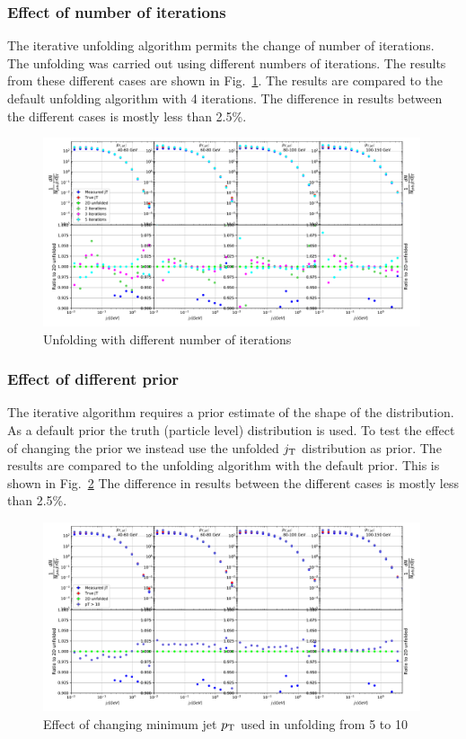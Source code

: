 \subsubsection{Effect of number of iterations}
\label{sec:iterations}
The iterative unfolding algorithm permits the change of number of iterations. The unfolding was carried out using different numbers of iterations. The results from these different cases are shown in Fig.~\ref{fig:iterations}. The results are compared to the default unfolding algorithm with 4 iterations. The difference in results between the different cases is mostly less than 2.5\%.
\begin{figure}
\includegraphics[width=0.99\textwidth]{figures/systematics/IterationsComparison.pdf}
\caption{Unfolding with different number of iterations}
\label{fig:iterations}
\end{figure}

\subsubsection{Effect of different prior}
\label{sec:prior}
The iterative algorithm requires a prior estimate of the shape of the distribution. As a default prior the truth (particle level) distribution is used. To test the effect of changing the prior we instead use the unfolded $j_{\rm T}$ distribution as prior. The results are compared to the unfolding algorithm with the default prior. This is shown in Fig.~\ref{fig:prior} The difference in results between the different cases is mostly less than 2.5\%. 
\begin{figure}
\includegraphics[width=0.99\textwidth]{figures/systematics/PtCutComparison10.pdf}
\caption{Effect of changing minimum jet $p_{\rm T}$ used in unfolding from 5 to 10 \gev}
\label{fig:prior}
\end{figure}

